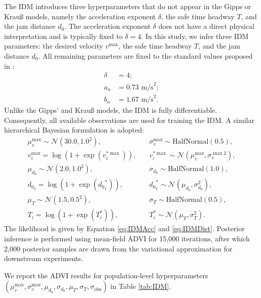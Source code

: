 \documentclass[journal]{IEEEtran}
\begin{document}
The IDM introduces three hyperparameters that do not appear in the Gipps or Krau{\ss} models, namely the acceleration exponent $\delta$, the safe time headway $T$, and the jam distance $d_0$. The acceleration exponent $\delta$ does not have a direct physical interpretation and is typically fixed to $\delta = 4$. In this study, we infer three IDM parameters: the desired velocity $v^{\max}$, the safe time headway $T$, and the jam distance $d_0$. All remaining parameters are fixed to the standard values proposed in \cite{Treiber2000}:
\begin{align*}
    \delta&=4; \\
    a_n&=0.73 \text{ m/s}^2; \\ 
    b_n&=1.67 \text{ m/s}^2.
\end{align*}
Unlike the Gipps' and Krau{\ss} models, the IDM is fully differentiable. Consequently, all available observations are used for training the IDM. A similar hierarchical Bayesian formulation is adopted:
\begin{align*}
    \mu_v^{\max}\sim\mathcal{N}(30.0, 1.0^2),&\quad \sigma_v^{\max}\sim\text{HalfNormal}(0.5), \\
    v_i^{\max}=\log(1+\exp(v_i^{*\max})),&\quad v_i^{*\max}\sim\mathcal{N}(\mu_v^{\max} ,\sigma_v^{\max 2}), \\
    \mu_{d_0}\sim\mathcal{N}(2.0, 1.0^2),&\quad \sigma_{d_0}\sim\text{HalfNormal}(1.0), \\
    {d_0}_i=\log(1+\exp({d_0}_i^{*})),&\quad {d_0}_i^{*}\sim\mathcal{N}(\mu_{d_0} ,\sigma_{d_0}^{2}), \\
    \mu_T\sim\mathcal{N}(1.5, 0.5^2),&\quad \sigma_T\sim\text{HalfNormal}(0.5), \\
    T_i=\log(1+\exp(T_i^{*})),&\quad T_i^{*}\sim\mathcal{N}(\mu_T ,\sigma_T^{2}).
\end{align*}
The likelihood is given by Equation \ref{eq:IDMAcc} and \ref{eq:IDMDist}. Posterior inference is performed using mean-field ADVI for 15,000 iterations, after which 2,000 posterior samples are drawn from the variational approximation for downstream experiments.

We report the ADVI results for population-level hyperparameters $(\mu_v^{\max},\sigma_v^{\max}, \mu_{d_0}, \sigma_{d_0}, \mu_{T}, \sigma_{T}, \sigma_{\text{obs}})$ in Table \ref{tab:IDM}.
\end{document}
